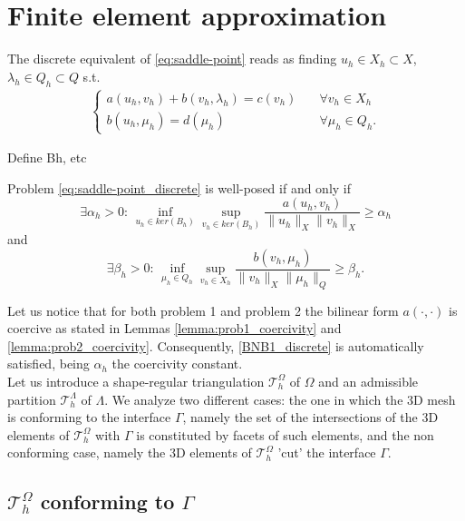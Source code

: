 \section{Finite element approximation}
The discrete equivalent of \eqref{eq:saddle-point} reads as finding $u_h\in X_h\subset X$, $\lambda_h\in Q_h\subset Q$ s.t.
\begin{eqnarray}\label{eq:saddle-point_discrete}
\begin{cases}
a(u_h,v_h)+b(v_h,\lambda_h)=c(v_h)\quad &\forall v_h\in X_h\\
b(u_h,\mu_h)=d(\mu_h) \quad &\forall \mu_h\in Q_h.
\end{cases}
\end{eqnarray}

{\color{red} Define Bh, etc}

\begin{theorem}
Problem \eqref{eq:saddle-point_discrete} is well-posed if and only if 
\begin{equation}\label{BNB1_discrete}
\exists \alpha_h >0 :\, \inf_{u_h\in ker(B_h)}\sup_{v_h\in ker(B_h)} \frac{a(u_h,v_h)}{\|u_h\|_{X}\|v_h\|_{X}}\geq \alpha_h
\end{equation}
and 
\begin{equation}\label{eq:infsup_discrete}
\exists \beta_h >0:\,\inf_{\mu_h\in Q_h}\sup_{v_h\in X_h} \frac{b(v_h,\mu_h)}{\|v_h\|_{X}\|\mu_h\|_{Q}}\geq \beta_h .
\end{equation}
\end{theorem}
Let us notice that for both problem 1 and problem 2 the bilinear form $a(\cdot, \cdot)$ is coercive as stated in Lemmas \eqref{lemma:prob1_coercivity} and \eqref{lemma:prob2_coercivity}. Consequently, \eqref{BNB1_discrete} is automatically satisfied, being $\alpha_h$ the coercivity constant.\\

Let us introduce a shape-regular triangulation $\mathcal{T}^{\Omega}_h$ of $\Omega$ and an admissible partition $\mathcal{T}^{\Lambda}_{h}$ of $\Lambda$. 
We analyze two different cases: the one in which the 3D mesh is conforming to the interface $\Gamma$, namely the set of the intersections of the 3D elements of $\mathcal{T}^{\Omega}_h$ with $\Gamma$ is constituted by facets of such elements, and the non conforming case, namely the 3D elements of $\mathcal{T}^{\Omega}_h$ 'cut' the interface $\Gamma$.

\subsection{$\mathcal{T}^{\Omega}_h$ conforming to $\Gamma$}
 
